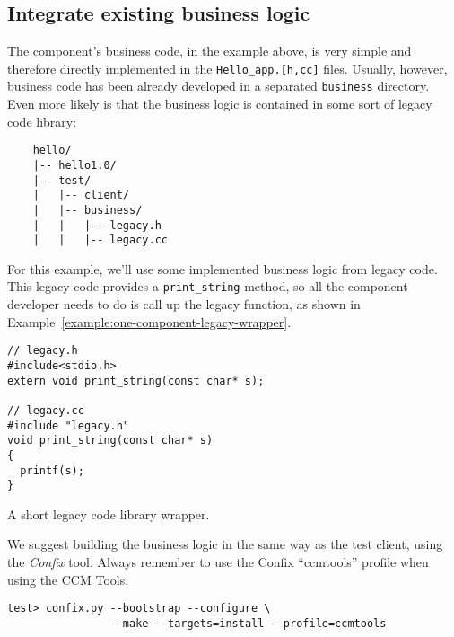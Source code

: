 \subsection{Integrate existing business logic}

The component's business code, in the example above, is very simple and
therefore directly implemented in the {\tt Hello\_app.[h,cc]} files. Usually,
however, business code has been already developed in a separated {\tt business}
directory. Even more likely is that the business logic is contained in some sort
of legacy code library:

\begin{small}
\begin{verbatim}
    hello/
    |-- hello1.0/
    |-- test/
    |   |-- client/
    |   |-- business/
    |   |   |-- legacy.h
    |   |   |-- legacy.cc
\end{verbatim}
\end{small}

For this example, we'll use some implemented business logic from legacy code.
This legacy code provides a {\tt print\_string} method, so all the component
developer needs to do is call up the legacy function, as shown in
Example~\ref{example:one-component-legacy-wrapper}.

\begin{Example}
\begin{minifbox}
\begin{small}
\begin{verbatim}
// legacy.h
#include<stdio.h>
extern void print_string(const char* s);

// legacy.cc
#include "legacy.h"
void print_string(const char* s)
{
  printf(s);
}
\end{verbatim}
\end{small}
\end{minifbox}
\caption{A short legacy code library wrapper.}
\label{example:one-component-legacy-wrapper}
\end{Example}

We suggest building the business logic in the same way as the test client, using
the {\it Confix} tool. Always remember to use the Confix ``ccmtools'' profile
when using the CCM Tools.

\begin{small}
\begin{verbatim}
test> confix.py --bootstrap --configure \
                --make --targets=install --profile=ccmtools
\end{verbatim}
\end{small}

